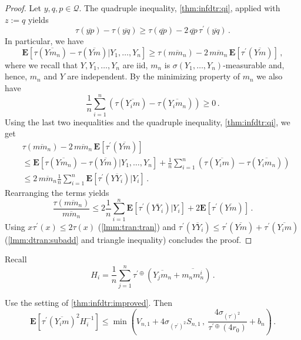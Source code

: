 \documentclass{article}
\newcommand*{\mc}[1]{\mathcal{#1}}
\newcommand{\lab}{\left[} %
\newcommand{\rab}{\right]} %
\newcommand{\ab}[1]{\lab #1 \rab} %
\newcommand{\abOf}[1]{\!\ab{#1}} %
\newcommand{\lb}{\left(} %
\newcommand{\rb}{\right)} %
\newcommand{\br}[1]{\lb #1 \rb} %
\newcommand{\brOf}[1]{\!\br{#1}} %
\newcommand{\E}{\mathbf{E}} %
\newcommand{\EOf}[1]{\E\abOf{#1}}
\newcommand{\pr}{^\prime}
\newcommand{\eqcm}{\,,} %
\newcommand{\eqfs}{\,.}
\newcommand{\ol}[2]{\overline{#1#2}}
\newcommand{\tran}{\tau}
\newcommand{\dtran}{\tau\pr}
\newcommand{\ddrtran}{\tau^{\prime\oplus}}
\begin{document}
\begin{proof}
    Let $y,q,p\in\mc Q$. The quadruple inequality, \cref{thm:infdtr:qi}, applied with $z := q$ yields
    \begin{equation}
        \tran(\ol yp) - \tran(\ol yq)
        \geq
        \tran(\ol qp) - 2 \,\ol qp\, \dtran(\ol yq)
        \eqfs
    \end{equation}
    In particular, we have
    \begin{equation}
        \EOf{\tran(\ol Y{m_n}) - \tran(\ol Ym) | Y_1,\dots,Y_n} \geq 
        \tran(\ol m{m_n}) - 2 \,\ol m{m_n}\, \EOf{\dtran(\ol Ym)}
        \eqcm
    \end{equation}
    where we recall that $Y, Y_1, \dots, Y_n$ are iid, $m_n$ is $\sigma(Y_1, \dots, Y_n)$-measurable and, hence, $m_n$ and $Y$ are independent.
    By the minimizing property of $m_n$ we also have
    \begin{equation}
        \frac1n\sum_{i=1}^n\br{\tran(\ol {Y_i}{m}) - \tran(\ol {Y_i}{m_n})} \geq 0
        \eqfs
    \end{equation}
    Using the last two inequalities and the quadruple inequality, \cref{thm:infdtr:qi}, we get
    \begin{align}
        &\tran(\ol m{m_n}) - 2 \,\ol m{m_n}\, \EOf{\dtran(\ol Ym)}
        \\&\leq 
        \EOf{\tran(\ol Y{m_n}) - \tran(\ol Ym) | Y_1,\dots,Y_n} + 
        \frac1n\sum_{i=1}^n\br{\tran(\ol {Y_i}{m}) - \tran(\ol {Y_i}{m_n})}
        \\&\leq
        2 \, \ol m{m_n} \frac1n \sum_{i=1}^n \EOf{\dtran(\ol Y{Y_i}) | Y_i}
        \eqfs
    \end{align}
    Rearranging the terms yields
    \begin{equation}
        \frac{\tran(\ol m{m_n})}{\ol m{m_n}}
        \leq
        2\frac1n \sum_{i=1}^n \EOf{\dtran(\ol Y{Y_i}) | Y_i}
        +
        2\EOf{\dtran(\ol Ym)}
        \eqfs
    \end{equation}
    Using $x \dtran(x) \leq 2 \tran(x)$ (\cref{lmm:tran:tran}) and $\dtran(\ol Y{Y_i}) \leq \dtran(\ol Y{m}) + \dtran(\ol {Y_i}m)$ (\cref{lmm:dtran:subadd} and triangle inequality) concludes the proof.
\end{proof}
%
Recall
\begin{equation}
    H_i = \frac1n \sum_{j=1}^n \ddrtran(\ol{Y_j}{m_n}+\ol{m_n}{m_n^i})
    \eqfs
\end{equation}
%
\begin{lemma}\label{lmm:infdtr:technical}
    Use the setting of \cref{thm:infdtr:improved}.
    Then
    \begin{equation}
        \EOf{\dtran(\ol{Y_i}m)^2 H_i^{-1}}
        \leq
        \min\brOf{V_{n,1} + 4 \sigma_{(\dtran)^{2}} S_{n,1}\eqcm \ \frac{4 \sigma_{(\dtran)^2}}{\ddrtran(4r_0)}
            +
            b_n}
        \eqfs
    \end{equation}
\end{lemma}
\end{document}
